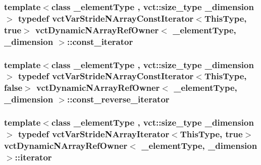 \subsubsection[{const\+\_\+iterator}]{\setlength{\rightskip}{0pt plus 5cm}template$<$class \+\_\+element\+Type , vct\+::size\+\_\+type \+\_\+dimension$>$ typedef {\bf vct\+Var\+Stride\+N\+Array\+Const\+Iterator}$<${\bf This\+Type}, true$>$ {\bf vct\+Dynamic\+N\+Array\+Ref\+Owner}$<$ \+\_\+element\+Type, \+\_\+dimension $>$\+::{\bf const\+\_\+iterator}}\label{classvct_dynamic_n_array_ref_owner_ab6652472746656a9be2de178295fd80b}
\hypertarget{classvct_dynamic_n_array_ref_owner_ade444e0883b2420a8a113171b6e49bf4}{}
\subsubsection[{const\+\_\+reverse\+\_\+iterator}]{\setlength{\rightskip}{0pt plus 5cm}template$<$class \+\_\+element\+Type , vct\+::size\+\_\+type \+\_\+dimension$>$ typedef {\bf vct\+Var\+Stride\+N\+Array\+Const\+Iterator}$<${\bf This\+Type}, false$>$ {\bf vct\+Dynamic\+N\+Array\+Ref\+Owner}$<$ \+\_\+element\+Type, \+\_\+dimension $>$\+::{\bf const\+\_\+reverse\+\_\+iterator}}\label{classvct_dynamic_n_array_ref_owner_ade444e0883b2420a8a113171b6e49bf4}
\hypertarget{classvct_dynamic_n_array_ref_owner_a9d68370074a5320a30354e700207ad71}{}
\subsubsection[{iterator}]{\setlength{\rightskip}{0pt plus 5cm}template$<$class \+\_\+element\+Type , vct\+::size\+\_\+type \+\_\+dimension$>$ typedef {\bf vct\+Var\+Stride\+N\+Array\+Iterator}$<${\bf This\+Type}, true$>$ {\bf vct\+Dynamic\+N\+Array\+Ref\+Owner}$<$ \+\_\+element\+Type, \+\_\+dimension $>$\+::{\bf iterator}}\label{classvct_dynamic_n_array_ref_owner_a9d68370074a5320a30354e700207ad71}
\hypertarget{classvct_dynamic_n_array_ref_owner_aabd87b1efc3a18043c6dac3d8017be59}{}
